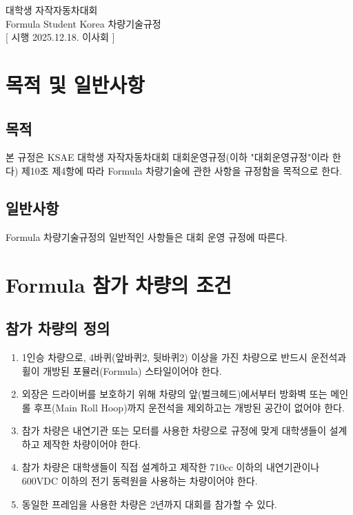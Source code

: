 \documentclass[final,a4paper,10pt]{report}
\begin{document}
\thispagestyle{firstpage}

\begin{center}
  {\pretendardb\fontsize{24}{28}\selectfont{} 대학생 자작자동차대회}\\[2ex]
  {\pretendardb\fontsize{24}{28}\selectfont{} Formula Student Korea 차량기술규정}\\[2.5ex]
  [ 시행 {\color{blue}2025.12.18.} 이사회 ]
\end{center}

\chapter{목적 및 일반사항}
\section{목적}\label{rule:formula-technical.purpose}
본 규정은 KSAE 대학생 자작자동차대회 대회운영규정(이하 "대회운영규정"이라 한다) 제10조 제4항에 따라 Formula 차량기술에 관한 사항을 규정함을 목적으로 한다.

\section{일반사항}\label{rule:formula-technical.general-provisions}
Formula 차량기술규정의 일반적인 사항들은 대회 운영 규정에 따른다.

\chapter{Formula 참가 차량의 조건}

\section{참가 차량의 정의}\label{rule:formula-technical.vehicle-definition}
\begin{enumerate}
  \item\label{rule:formula-technical.vehicle-definition.single-seat-open-wheel} 1인승 차량으로, 4바퀴(앞바퀴2, 뒷바퀴2) 이상을 가진 차량으로 반드시 운전석과 휠이 개방된 포뮬러(Formula) 스타일이어야 한다.
  \item\label{rule:formula-technical.vehicle-definition.enclosed-bodywork} 외장은 드라이버를 보호하기 위해 차량의 앞(벌크헤드)에서부터 방화벽 또는 메인 롤 후프(Main Roll Hoop)까지 운전석을 제외하고는 개방된 공간이 없어야 한다.
  \item\label{rule:formula-technical.vehicle-definition.student-designed-and-built} 참가 차량은 내연기관 또는 모터를 사용한 차량으로 규정에 맞게 대학생들이 설계하고 제작한 차량이어야 한다.
  \item\label{rule:formula-technical.vehicle-definition.displacement-and-voltage-limits} 참가 차량은 대학생들이 직접 설계하고 제작한 710cc 이하의 내연기관이나 600VDC 이하의 전기 동력원을 사용하는 차량이어야 한다.
  \item\label{rule:formula-technical.vehicle-definition.frame-reuse-2yr-limit} 동일한 프레임을 사용한 차량은 2년까지 대회를 참가할 수 있다.
\end{enumerate}
\end{document}
